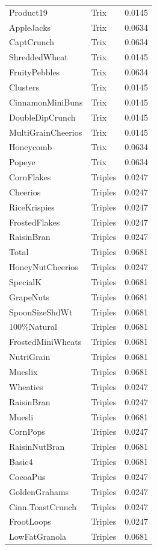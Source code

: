 \begin{longtable}{llr}
Product19 & Trix & 0.0145 \\
AppleJacks & Trix & 0.0634 \\
CaptCrunch & Trix & 0.0634 \\
ShreddedWheat & Trix & 0.0145 \\
FruityPebbles & Trix & 0.0634 \\
Clusters & Trix & 0.0145 \\
CinnamonMiniBuns & Trix & 0.0145 \\
DoubleDipCrunch & Trix & 0.0145 \\
MultiGrainCheerios & Trix & 0.0145 \\
Honeycomb & Trix & 0.0634 \\
Popeye & Trix & 0.0634 \\
CornFlakes & Triples & 0.0247 \\
Cheerios & Triples & 0.0247 \\
RiceKrispies & Triples & 0.0247 \\
FrostedFlakes & Triples & 0.0247 \\
RaisinBran & Triples & 0.0247 \\
Total & Triples & 0.0681 \\
HoneyNutCheerios & Triples & 0.0247 \\
SpecialK & Triples & 0.0681 \\
GrapeNuts & Triples & 0.0681 \\
SpoonSizeShdWt & Triples & 0.0681 \\
100\%Natural & Triples & 0.0681 \\
FrostedMiniWheats & Triples & 0.0681 \\
NutriGrain & Triples & 0.0681 \\
Mueslix & Triples & 0.0681 \\
Wheaties & Triples & 0.0247 \\
RaisinBran & Triples & 0.0247 \\
Muesli & Triples & 0.0681 \\
CornPops & Triples & 0.0247 \\
RaisinNutBran & Triples & 0.0681 \\
Basic4 & Triples & 0.0681 \\
CocoaPus & Triples & 0.0247 \\
GoldenGrahams & Triples & 0.0247 \\
Cinn.ToastCrunch & Triples & 0.0247 \\
FrootLoops & Triples & 0.0247 \\
LowFatGranola & Triples & 0.0681 \\

\end{longtable}
